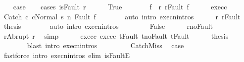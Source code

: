 \begin{isabellebody}
\ \ \isamarkupfalse%
\ {\isacharquery}case\isanewline
\ \ \isamarkupfalse%
\ {\isacharparenleft}cases\ {\isachardoublequoteopen}isFault\ r{\isacharprime}{\isachardoublequoteclose}{\isacharparenright}\isanewline
\ \ \ \ \isamarkupfalse%
\ True\isanewline
\ \ \ \ \isamarkupfalse%
\ \isamarkupfalse%
\ f{\isacharprime}\ \ r{\isacharprime}{\isacharcolon}\ {\isachardoublequoteopen}r{\isacharprime}{\isacharequal}Fault\ f{\isacharprime}{\isachardoublequoteclose}\isacommand{{\isachardot}{\isachardot}}\isamarkupfalse%
\isanewline
\ \ \ \ \isamarkupfalse%
\ exec{\isacharunderscore}c{}\ \isamarkupfalse%
\ {\isachardoublequoteopen}{\isasymGamma}{\isasymturnstile}{\isasymlangle}Catch\ c{}\ c{}{\isacharcomma}Normal\ s{\isasymrangle}\ {\isacharequal}n{\isasymRightarrow}\ Fault\ f{\isacharprime}{\isachardoublequoteclose}\isanewline
\ \ \ \ \ \ \isamarkupfalse%
\ {\isacharparenleft}auto\ intro{\isacharcolon}\ execn{\isachardot}intros{\isacharparenright}\isanewline
\ \ \ \ \isamarkupfalse%
\ r{\isacharprime}\ r{\isacharprime}{\isacharunderscore}Fault\ \isamarkupfalse%
\ {\isacharquery}thesis\isanewline
\ \ \ \ \ \ \isamarkupfalse%
\ {\isacharparenleft}auto\ intro{\isacharcolon}\ execn{\isachardot}intros{\isacharparenright}\isanewline
\ \ \isamarkupfalse%
\isanewline
\ \ \ \ \isamarkupfalse%
\ False\isanewline
\ \ \ \ \isamarkupfalse%
\ r{\isacharprime}{\isacharunderscore}noFault\ \isamarkupfalse%
\ {\isachardoublequoteopen}r{\isacharprime}{\isacharequal}Abrupt\ r{\isachardoublequoteclose}\ \isamarkupfalse%
\ simp\isanewline
\ \ \ \ \isamarkupfalse%
\ exec{\isacharunderscore}c{}\ exec{\isacharunderscore}c{}\ t{\isacharunderscore}Fault\ t{\isacharprime}{\isacharunderscore}noFault\ t{\isacharprime}{\isacharunderscore}Fault\isanewline
\ \ \ \ \isamarkupfalse%
\ {\isacharquery}thesis\ \isanewline
\ \ \ \ \ \ \isamarkupfalse%
\ {\isacharparenleft}blast\ intro{\isacharcolon}\ execn{\isachardot}intros{\isacharparenright}\isanewline
\ \ \isamarkupfalse%
\isanewline
{}\isamarkupfalse%
\ \ \isanewline
\ \ \isamarkupfalse%
\ CatchMiss\ \isamarkupfalse%
\ {\isacharquery}case\ \isamarkupfalse%
\ {\isacharparenleft}fastforce\ intro{\isacharcolon}\ execn{\isachardot}intros\ elim{\isacharcolon}\ isFaultE{\isacharparenright}\isanewline

\end{isabellebody}
